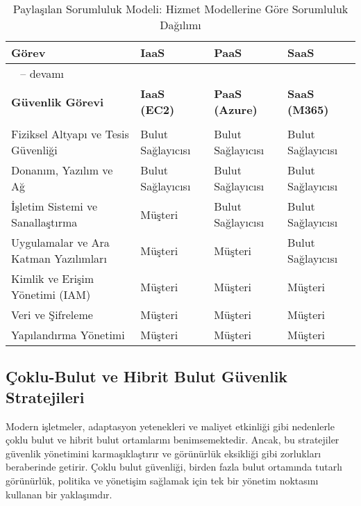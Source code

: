 \begin{longtable}{|>{\scriptsize}p{1.1cm}|>{\scriptsize}p{1cm}|>{\scriptsize}p{1cm}|>{\scriptsize}p{1cm}|}
\caption{Paylaşılan Sorumluluk Modeli: Hizmet Modellerine Göre Sorumluluk Dağılımı}
\label{tab:shared_responsibility_model}\\
\hline
\rowcolor{tableheadcolor}
\textbf{Görev} & \textbf{IaaS} & \textbf{PaaS} & \textbf{SaaS}\\
\hline
\endfirsthead
\multicolumn{4}{c}%
{\tablename\ \thetable{} -- devamı}\\
\hline
\textbf{Güvenlik Görevi} & \textbf{IaaS (EC2)} & \textbf{PaaS (Azure)} & \textbf{SaaS (M365)}\\
\hline
\endhead
\hline
\multicolumn{4}{|r|}{Devamı bir sonraki sayfada}\\
\hline
\endfoot
\hline
\endlastfoot
Fiziksel Altyapı ve Tesis Güvenliği & Bulut Sağlayıcısı & Bulut Sağlayıcısı & Bulut Sağlayıcısı \\
\hline
Donanım, Yazılım ve Ağ & Bulut Sağlayıcısı & Bulut Sağlayıcısı & Bulut Sağlayıcısı \\
\hline
İşletim Sistemi ve Sanallaştırma & Müşteri & Bulut Sağlayıcısı & Bulut Sağlayıcısı \\
\hline
Uygulamalar ve Ara Katman Yazılımları & Müşteri & Müşteri & Bulut Sağlayıcısı \\
\hline
Kimlik ve Erişim Yönetimi (IAM) & Müşteri & Müşteri & Müşteri \\
\hline
Veri ve Şifreleme & Müşteri & Müşteri & Müşteri \\
\hline
Yapılandırma Yönetimi & Müşteri & Müşteri & Müşteri \\
\hline
\end{longtable}

\subsection{Çoklu-Bulut ve Hibrit Bulut Güvenlik Stratejileri}

Modern işletmeler, adaptasyon yetenekleri ve maliyet etkinliği gibi nedenlerle çoklu bulut ve hibrit bulut ortamlarını benimsemektedir. Ancak, bu stratejiler güvenlik yönetimini karmaşıklaştırır ve görünürlük eksikliği gibi zorlukları beraberinde getirir. Çoklu bulut güvenliği, birden fazla bulut ortamında tutarlı görünürlük, politika ve yönetişim sağlamak için tek bir yönetim noktasını kullanan bir yaklaşımdır.

